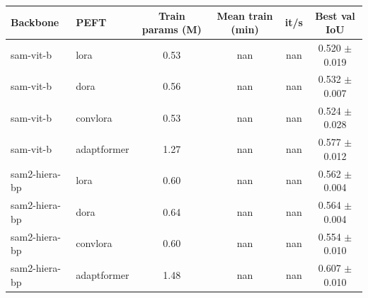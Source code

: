 \begin{tabular}{llcccc}
\toprule
Backbone & PEFT & Train params (M) & Mean train (min) & it/s & Best val IoU \\
\midrule
sam-vit-b & lora & 0.53 & nan & nan & 0.520 $\pm$ 0.019 \\
sam-vit-b & dora & 0.56 & nan & nan & 0.532 $\pm$ 0.007 \\
sam-vit-b & convlora & 0.53 & nan & nan & 0.524 $\pm$ 0.028 \\
sam-vit-b & adaptformer & 1.27 & nan & nan & 0.577 $\pm$ 0.012 \\
sam2-hiera-bp & lora & 0.60 & nan & nan & 0.562 $\pm$ 0.004 \\
sam2-hiera-bp & dora & 0.64 & nan & nan & 0.564 $\pm$ 0.004 \\
sam2-hiera-bp & convlora & 0.60 & nan & nan & 0.554 $\pm$ 0.010 \\
sam2-hiera-bp & adaptformer & 1.48 & nan & nan & 0.607 $\pm$ 0.010 \\
\bottomrule
\end{tabular}

